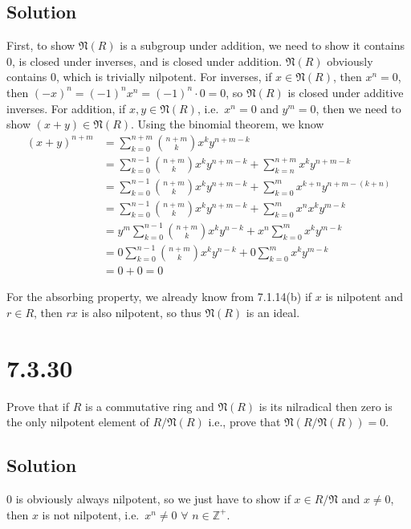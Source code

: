 \documentclass[fleqn]{article}
\begin{document}
        \subsection{Solution}
        First, to show $\mathfrak{N}(R)$ is a subgroup under addition, we need to show it contains 0, is closed under inverses, and is closed under addition.  $\mathfrak{N}(R)$ obviously contains 0, which is trivially nilpotent.  For inverses, if $x \in \mathfrak{N}(R)$, then $x^n = 0$, then $(-x)^n = (-1)^n x^n = (-1)^n \cdot 0 = 0$, so $\mathfrak{N}(R)$ is closed under additive inverses.  For addition, if $x, y \in \mathfrak{N}(R)$, i.e.\ $x^n = 0$ and $y^m = 0$, then we need to show $(x + y) \in \mathfrak{N}(R)$.  Using the binomial theorem, we know
        \begin{align}
            (x + y)^{n + m} &= \sum\limits_{k = 0}^{n + m} \binom{n + m}{k} x^k y^{n + m - k} \\
                &= \sum\limits_{k = 0}^{n - 1} \binom{n + m}{k} x^k y^{n + m - k} + \sum\limits_{k = n}^{n + m} x^k y^{n + m - k} \\
                &= \sum\limits_{k = 0}^{n - 1} \binom{n + m}{k} x^k y^{n + m - k} + \sum\limits_{k = 0}^{m} x^{k + n} y^{n + m - (k + n)} \\
                &= \sum\limits_{k = 0}^{n - 1} \binom{n + m}{k} x^k y^{n + m - k} + \sum\limits_{k = 0}^{m} x^n x^k y^{m - k} \\
                &= y^m \sum\limits_{k = 0}^{n - 1} \binom{n + m}{k} x^k y^{n - k} + x^n \sum\limits_{k = 0}^{m} x^k y^{m - k} \\
                &= 0 \sum\limits_{k = 0}^{n - 1} \binom{n + m}{k} x^k y^{n - k} + 0 \sum\limits_{k = 0}^{m} x^k y^{m - k} \\
                &= 0 + 0 = 0
        \end{align}
        
        For the absorbing property, we already know from 7.1.14(b) if $x$ is nilpotent and $r \in R$, then $rx$ is also nilpotent, so thus $\mathfrak{N}(R)$ is an ideal.
    
    \section{7.3.30}
    Prove that if $R$ is a commutative ring and $\mathfrak{N}(R)$ is its nilradical then zero is the only nilpotent element of $R/\mathfrak{N}(R)$ i.e., prove that $\mathfrak{N}({R/\mathfrak{N}(R)}) = 0$.
        
        \subsection{Solution}
        0 is obviously always nilpotent, so we just have to show if $x \in R/\mathfrak{N}$ and $x \neq 0$, then $x$ is not nilpotent, i.e.\ $x^n \neq 0$ $\forall$ $n \in \mathbb{Z}^+$.
        
\end{document}
